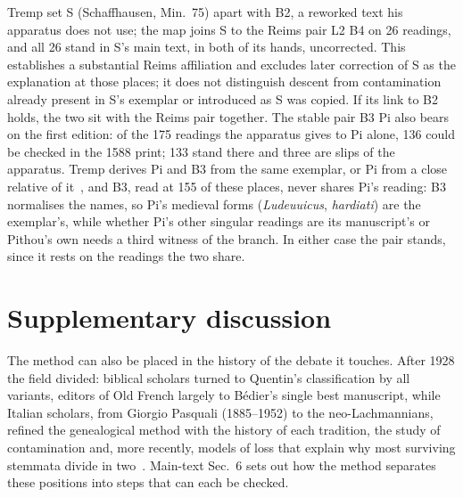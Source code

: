 \documentclass[11pt,a4paper]{article}
\theoremstyle{remark}
\begin{document}
Tremp set S (Schaffhausen, Min.~75) apart with B2, a reworked text his apparatus does not use; the map joins S to the Reims pair L2 B4 on 26 readings, and all 26 stand in S's main text, in both of its hands, uncorrected. This establishes a substantial Reims affiliation and excludes later correction of S as the explanation at those places; it does not distinguish descent from contamination already present in S's exemplar or introduced as S was copied. If its link to B2 holds, the two sit with the Reims pair together. The stable pair B3 Pi also bears on the first edition: of the 175 readings the apparatus gives to Pi alone, 136 could be checked in the 1588 print; 133 stand there and three are slips of the apparatus. Tremp derives Pi and B3 from the same exemplar, or Pi from a close relative of it~\citep[pp.~48, 52]{Tremp1995}, and B3, read at 155 of these places, never shares Pi's reading: B3 normalises the names, so Pi's medieval forms (\emph{Ludeuuicus}, \emph{hardiati}) are the exemplar's, while whether Pi's other singular readings are its manuscript's or Pithou's own needs a third witness of the branch. In either case the pair stands, since it rests on the readings the two share.

\section{Supplementary discussion}
\label{app:discussion}
The method can also be placed in the history of the debate it touches. After 1928 the field divided: biblical scholars turned to Quentin's classification by all variants, editors of Old French largely to Bédier's single best manuscript, while Italian scholars, from Giorgio Pasquali (1885--1952) to the neo-Lachmannians, refined the genealogical method with the history of each tradition, the study of contamination and, more recently, models of loss that explain why most surviving stemmata divide in two~\citep{Roelli2020,Trovato2017,GuidiTrovato2004,Weitzman1987}. Main-text Sec.~6 sets out how the method separates these positions into steps that can each be checked.
\end{document}
